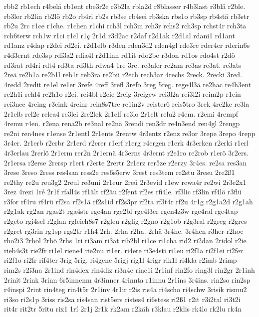 {rbb2
rb1ech
r4belä
rb1ent
rbe3r2e
r3b2la
rbla2d
r8blasser
r4b3last
r3blä
r2ble.
rb3ler
rb2lin
rb2lö
rb2o
rb4ri
rb2s
rb3se
rb4sei
rb3ska
rbs1o
rb3sp
rb4stä
rb3str
rb2u
2rc
r1ce
r1che.
r1chen
r1chi
rch3l
rch3m
rch3r
rchs2
rch3sp
rchst4r
rch3ta
rch6terw
rch1w
r1ci
r1cl
r1ç
2r1d
r3d2ac
r2daf
r2d1ak
r2d1al
rdani1
rd1ant
rd1anz
r4dap
r2dei
rd2ei.
r2d1elb
r3den
rden3d2
rden4gl
rde3re
rder4er
rderin6s
r4d3ernt
rde3sp
rdi3a2
rdia4l
r2d1inn
rd1it
rdo2be
r3don
rd1os
rdo4st
r2dö
rd3rat
rd4ri
rdt4
rd3ta
rd3th
rdwa4
1re
3re.
re3aler
re2am
re3as
re3at.
re3ats
2reä
re2b1a
re2b1l
reb1r
reb3ra
re2bü
r2ech
rech3ar
4rechs
2reck.
2recki
3red.
4redd
2redit
re1el
re1er
3refe
4reff
3refl
3refo
3reg
5reg.
rege4l3ä
re2hac
re4h3ent
re2h1i
rehl4
re2h1o
r2ei.
rei4bl
r2eie
2reig
3reigew
rei3l2a
rei3l2i
reim2p
r1ein
rei3nec
4reing
r3eink
4reinr
rein8s7tre
re1in2v
reister6
reis5tro
3rek
4re2ke
re3la
2r1elb
rel2e
relea4
re3lei
2re2lek
2r1elf
re3lo
2r1elt
relu2
r4em.
r2emi
4rempf
4remu
r4en.
r2ena
rena2b
re3nal
re2nä
3rendi
ren3dr
re4n3end
ren4gl
2rengp
re2ni
ren4nes
r1ense
2r1entl
2r1ents
2rentw
4r3entz
r2enz
re3or
3repe
3repo
4repp
3r4er.
2r1erb
r2erbr
2r1erd
r2erer
r1erf
r1erg
r4ergen
r1erk
4r3erken
r2erki
r1erl
4r3erlau
2rerlö
2r1erm
rer2n
2r1ernä
4r3erns
4r3ernt
r2e1ro
re2rob
r1erö
3r2ers.
2r1ersa
r2erse
2rersp
r1ert
r2erte
2rertr
2r1erz
rer5ze
r2erzy
3r4es.
re2sa
res3an
3rese
3reso
2ress
res4saa
ress2e
res6s5erw
3rest
res3tem
re2stu
3resu
2re2ß1
re2thy
re2u
reu3g2
2reul
re3uni
2r1eur
2reü
2r3evid
r1ew
rewa4r
re2wi
2r3e2x1
3rez
4rezi
1ré
2r1f
rfall4s
rf1ält
rf2äu
r2fent
rf2es
rfi4le.
rf3lic
rf3lin
rf4lö
r3flü
r3for
rf4ru
rf4rü
rf2sa
rf2s1ä
rf2s1id
rf2s3pr
rf2ta
rf3t4r
rf2u
4r1g
r2g1a2d
r2g1ah
r2g1ak
rg2an
rgas2t
rga4str
rge4an
rge2bl
rge4l3er
rgen4z3w
rge4ral
rge4tap
r2geto
rgi4sel
r2glan
rgleich8s7
r2gleu
r2glig
r2gno
r2g1ob
r2g3ral
r2greg
r2gres
r2gret
rg3rin
rg1sp
rgs2tr
r1h4
2rh.
2rha
r2ha.
2rhä
3r4he.
3r4hen
r3her
r2hoe
rho2i3
2rhol
2rhö
2rhs
1ri
ri3am
ri3at
rib2bl
ri1ce
ri1cha
rid2
ri2dan
2ridol
r2ie
rieb4s3t
rie2fr
ri1el
riene4
rie2nu
ri1er.
ri4ere
ri3e4sti
ri1eu
ri2f1a
ri2f1ei
ri2fer
ri2f1o
ri2fr
rif4ter
3rig
5rig.
ri4gene
5rigj
rig1l
4rigr
rik1l
ri4kla
r2imb
2rimp
rim2s
r2i3na
2r1ind
rin4dex
rin4diz
ri3n4e
rine1i
2r1inf
rin2fo
ring3l
rin2gr
2r1inh
2rinit
2rink
3rinn
6r5innenm
4r3inner
4rinnta
r1innu
2r1ins
3r4ins.
rin2so
rin2sp
r4inspi
2rint
rin4teg
rin4t5r
2r1inv
4r1ir
r2is
ris4a
ri4scho
ri4schw
3risik
rismu2
ri3so
ri2s1p
3riss
ris2sa
ris4san
rist5ers
ristes4
ri6stess
ri2ß1
r2it
r3i2tal
ri3t2i
rit4r
rit2tr
5ritu
rix1
1rí
2r1j
2r1k
rk2am
r2käh
r3klau
r2klis
rk4lo
rk2lu
rk4n
}
